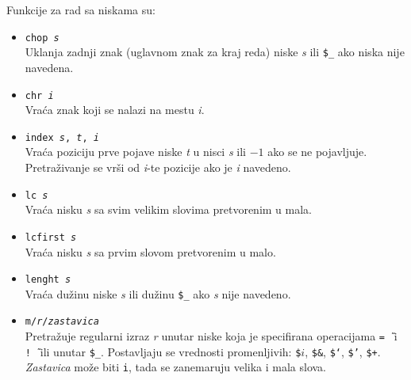 \documentclass[12pt,a4paper]{article}
\begin{document}
        Funkcije za rad sa niskama su:
        \begin{itemize}
        \item
          {\tt chop {\it s}}\\
          Uklanja zadnji znak (uglavnom znak za kraj reda) niske {\it s} ili
          {\tt\$\_} ako niska nije navedena.
        \item
          {\tt chr {\it i}}\\
          Vra\'ca znak koji se nalazi na mestu {\it i}.
        \item
          {\tt index {\it s}, {\it t}, {\it i}}\\
          Vra\'ca poziciju prve pojave niske {\it t} u nisci {\it s} ili
          $-1$ ako se ne pojavljuje.
          Pretra\v zivanje se vr\v si od {\it i}-te pozicije ako je {\it i}
          navedeno.
        \item
          {\tt lc {\it s}}\\
          Vra\'ca nisku {\it s} sa svim velikim slovima pretvorenim u mala.
        \item
          {\tt lcfirst {\it s}}\\
          Vra\'ca nisku {\it s} sa prvim slovom pretvorenim u malo.
        \item
          {\tt lenght {\it s}}\\
          Vra\'ca du\v zinu niske {\it s} ili du\v zinu {\tt\$\_} ako {\it s}
          nije navedeno.
        \item
          {\tt m/{\it r}/{\it zastavica}}\\
          Pretra\v zuje regularni izraz {\it r} unutar niske koja je
          specifirana operacijama {\tt=\~\ } i {\tt!\~\ } ili unutar
          {\tt\$\_}.
          Postavljaju se vrednosti promenljivih: {\tt\$$i$}, {\tt\$\&},
          {\tt\$`}, {\tt\$'}, {\tt\$+}.
          {\it Zastavica} mo\v ze biti {\tt i}, tada se zanemaruju velika i
          mala slova.


\end{itemize}
\end{document}
